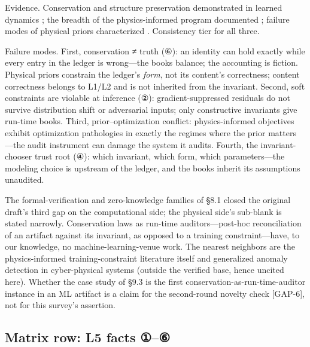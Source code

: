 \documentclass[11pt,a4paper]{article}
\begin{document}
Evidence. Conservation and structure preservation demonstrated in learned dynamics \cite{key11}; the breadth of the physics-informed program documented \cite{key12}; failure modes of physical priors characterized \cite{key13}. Consistency tier for all three.

Failure modes. First, conservation ≠ truth (⑥): an identity can hold exactly while every entry in the ledger is wrong—the books balance; the accounting is fiction. Physical priors constrain the ledger's \textit{form}, not its content's correctness; content correctness belongs to L1/L2 and is not inherited from the invariant. Second, soft constraints are violable at inference (②): gradient-suppressed residuals do not survive distribution shift or adversarial inputs; only constructive invariants give run-time books. Third, prior–optimization conflict: physics-informed objectives exhibit optimization pathologies in exactly the regimes where the prior matters \cite{key13}—the audit instrument can damage the system it audits. Fourth, the invariant-chooser trust root (④): which invariant, which form, which parameters—the modeling choice is upstream of the ledger, and the books inherit its assumptions unaudited.

The formal-verification and zero-knowledge families of §8.1 closed the original draft's third gap on the computational side; the physical side's sub-blank is stated narrowly. Conservation laws as run-time auditors—post-hoc reconciliation of an artifact against its invariant, as opposed to a training constraint—have, to our knowledge, no machine-learning-venue work. The nearest neighbors are the physics-informed training-constraint literature itself \cite{key12,key13} and generalized anomaly detection in cyber-physical systems (outside the verified base, hence uncited here). Whether the case study of §9.3 is the first conservation-as-run-time-auditor instance in an ML artifact is a claim for the second-round novelty check [GAP-6], not for this survey's assertion.

\subsection{Matrix row: L5 facts ①–⑥}
\end{document}
